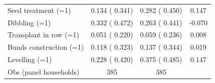 \begin{tabular}{lccc}
Seed treatment (=1) &     0.134 (    0.341) &     0.282 (    0.450) &     0.147\sym{***} \\
Dibbling (=1) &     0.332 (    0.472) &     0.263 (    0.441) &    -0.070\sym{*} \\
Transplant in row (=1) &     0.051 (    0.220) &     0.059 (    0.236) &     0.008 \\
Bunds construction (=1) &     0.118 (    0.323) &     0.137 (    0.344) &     0.019 \\
Levelling (=1) &     0.228 (    0.420) &     0.375 (    0.485) &     0.147\sym{**} \\
\midrule
Obs (panel households) & 385 & 385 & \\
\bottomrule
\end{tabular}
